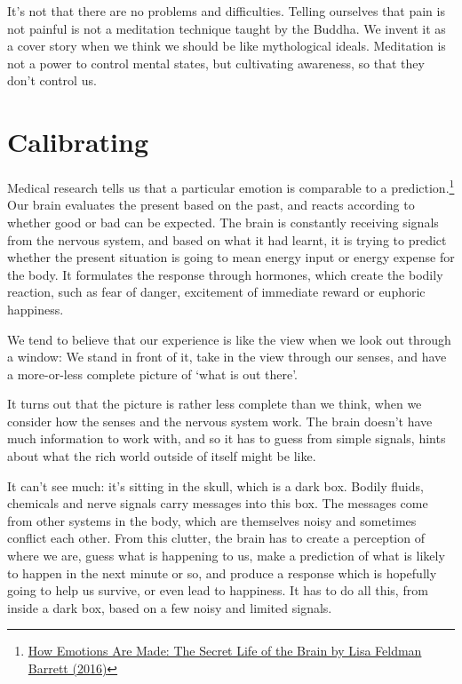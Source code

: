 It's not that there are no problems and difficulties. Telling ourselves
that pain is not painful is not a meditation technique taught by the
Buddha. We invent it as a cover story when we think we should be like
mythological ideals. Meditation is not a power to control mental states,
but cultivating awareness, so that they don't control us.

\clearpage

\section{Calibrating}


Medical research tells us that a particular emotion is comparable to a
prediction.\footnote{\href{https://www.goodreads.com/book/show/23719305-how-emotions-are-made}{How
  Emotions Are Made: The Secret Life of the Brain by Lisa Feldman
  Barrett (2016)}} Our brain evaluates the present based on the past,
and reacts according to whether good or bad can be expected. The brain
is constantly receiving signals from the nervous system, and based on
what it had learnt, it is trying to predict whether the present
situation is going to mean energy input or energy expense for the body.
It formulates the response through hormones, which create the bodily
reaction, such as fear of danger, excitement of immediate reward or
euphoric happiness.

We tend to believe that our experience is like the view when we look out
through a window: We stand in front of it, take in the view through our
senses, and have a more-or-less complete picture of `what is out there'.

It turns out that the picture is rather less complete than we think,
when we consider how the senses and the nervous system work. The brain
doesn't have much information to work with, and so it has to guess from
simple signals, hints about what the rich world outside of itself might
be like.

It can't see much: it's sitting in the skull, which is a dark box.
Bodily fluids, chemicals and nerve signals carry messages into this box.
The messages come from other systems in the body, which are themselves
noisy and sometimes conflict each other. From this clutter, the brain
has to create a perception of where we are, guess what is happening to
us, make a prediction of what is likely to happen in the next minute or
so, and produce a response which is hopefully going to help us survive,
or even lead to happiness. It has to do all this, from inside a dark
box, based on a few noisy and limited signals.

